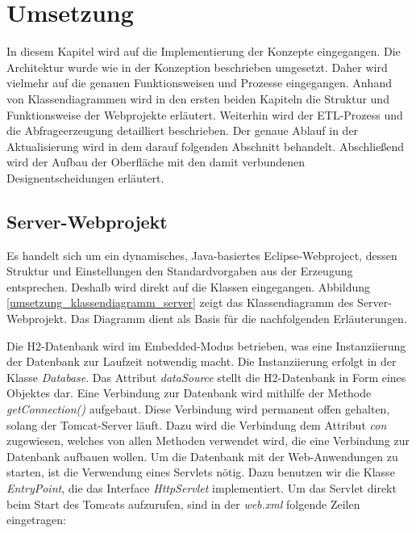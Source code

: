 

\chapter{Umsetzung}
\label{ch:umsetzung}

In diesem Kapitel wird auf die Implementierung der Konzepte eingegangen. Die Architektur wurde wie in der Konzeption beschrieben umgesetzt. Daher wird vielmehr auf die genauen Funktionsweisen und Prozesse eingegangen. Anhand von Klassendiagrammen wird in den ersten beiden Kapiteln die Struktur und Funktionsweise der Webprojekte erläutert. Weiterhin wird der ETL-Prozess und die Abfrageerzeugung detailliert beschrieben. Der genaue Ablauf in der Aktualisierung wird in dem darauf folgenden Abschnitt behandelt. Abschließend wird der Aufbau der Oberfläche mit den damit verbundenen Designentscheidungen erläutert. 

\section{Server-Webprojekt}

Es handelt sich um ein dynamisches, Java-basiertes Eclipse-Webproject, dessen Struktur und Einstellungen den Standardvorgaben aus der Erzeugung entsprechen. Deshalb wird direkt auf die Klassen eingegangen. Abbildung \ref{umsetzung_klassendiagramm_server} zeigt das Klassendiagramm des Server-Webprojekt. Das Diagramm dient als Basis für die nachfolgenden Erläuterungen. 

Die H2-Datenbank wird im Embedded-Modus betrieben, was eine Instanziierung der Datenbank zur Laufzeit notwendig macht. Die Instanziierung erfolgt in der Klasse \textit{Database}. Das Attribut \textit{dataSource} stellt die H2-Datenbank in Form eines Objektes dar. Eine Verbindung zur Datenbank wird mithilfe der Methode \textit{getConnection()} aufgebaut. Diese Verbindung wird permanent offen gehalten, solang der Tomcat-Server läuft. Dazu wird die Verbindung dem Attribut \textit{con} zugewiesen, welches von allen Methoden verwendet wird, die eine Verbindung zur Datenbank aufbauen wollen. Um die Datenbank mit der Web-Anwendungen zu starten, ist die Verwendung eines Servlets nötig. Dazu benutzen wir die Klasse \textit{EntryPoint}, die das Interface \textit{HttpServlet} implementiert. Um das Servlet direkt beim Start des Tomcats aufzurufen, sind in der \textit{web.xml} folgende Zeilen eingetragen: 

